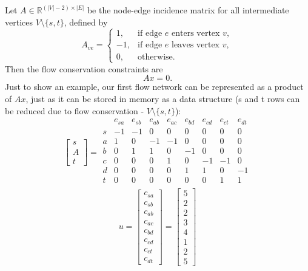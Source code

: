 \documentclass[12pt, openany]{article}
\begin{document}
Let \(A \in \mathbb{R}^{(|V|-2)\times |E|}\) be the node-edge incidence matrix for all intermediate vertices \(V\setminus\{s,t\}\), defined by
\[
A_{ve}=
\begin{cases}
1, & \text{if edge } e \text{ enters vertex } v,\\
-1, & \text{if edge } e \text{ leaves vertex } v,\\
0, & \text{otherwise.}
\end{cases}
\]
Then the flow conservation constraints are
\[
Ax=0.
\]
Just to show an example, our first flow network can be represented as a product of \(Ax\), just as it can be stored in memory as a data structure (s and t rows can be reduced due to flow conservation - \(V\setminus\{s,t\}\)):
\[
\begin{bmatrix}
s \\
A \\
t
\end{bmatrix}
=
\begin{array}{c|ccccccccc}
 & e_{sa} & e_{sb} & e_{ab} & e_{ac} & e_{bd} & e_{cd} & e_{ct}& e_{dt}\\
\hline
s & -1 & -1 & 0 & 0 & 0 & 0 & 0 & 0\\
a & 1 & 0 & -1 & -1 & 0 & 0 & 0 & 0 \\
b & 0 & 1 & 1 & 0 & -1 & 0 & 0 & 0 \\
c & 0 & 0 & 0 & 1 & 0 & -1 & -1 & 0\\
d & 0 & 0 & 0 & 0 & 1 & 1 & 0 & -1 \\
t & 0 & 0 & 0 & 0 & 0 & 0 & 1 & 1 \\
\end{array}
\]
\[
u=
\begin{bmatrix}
c_{sa} \\
c_{sb} \\
c_{ab} \\
c_{ac} \\
c_{bd} \\
c_{cd} \\
c_{ct} \\
c_{dt}
\end{bmatrix}
=
\begin{bmatrix}
5\\
2\\
2\\
3\\
4\\
1\\
2\\
5
\end{bmatrix}
\]
\end{document}
